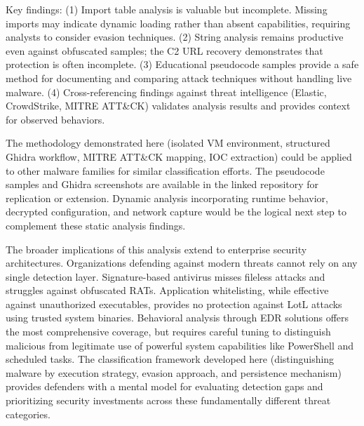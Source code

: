 \documentclass[sigconf]{acmart}
\begin{document}
\qquad Key findings: (1) Import table analysis is valuable but incomplete. Missing imports may indicate dynamic loading rather than absent capabilities, requiring analysts to consider evasion techniques. (2) String analysis remains productive even against obfuscated samples; the C2 URL recovery demonstrates that protection is often incomplete. (3) Educational pseudocode samples provide a safe method for documenting and comparing attack techniques without handling live malware. (4) Cross-referencing findings against threat intelligence (Elastic, CrowdStrike, MITRE ATT\&CK) validates analysis results and provides context for observed behaviors.

\qquad The methodology demonstrated here (isolated VM environment, structured Ghidra workflow, MITRE ATT\&CK mapping, IOC extraction) could be applied to other malware families for similar classification efforts. The pseudocode samples and Ghidra screenshots are available in the linked repository for replication or extension. Dynamic analysis incorporating runtime behavior, decrypted configuration, and network capture would be the logical next step to complement these static analysis findings.

\qquad The broader implications of this analysis extend to enterprise security architectures. Organizations defending against modern threats cannot rely on any single detection layer. Signature-based antivirus misses fileless attacks and struggles against obfuscated RATs. Application whitelisting, while effective against unauthorized executables, provides no protection against LotL attacks using trusted system binaries. Behavioral analysis through EDR solutions offers the most comprehensive coverage, but requires careful tuning to distinguish malicious from legitimate use of powerful system capabilities like PowerShell and scheduled tasks. The classification framework developed here (distinguishing malware by execution strategy, evasion approach, and persistence mechanism) provides defenders with a mental model for evaluating detection gaps and prioritizing security investments across these fundamentally different threat categories.




\end{document}
